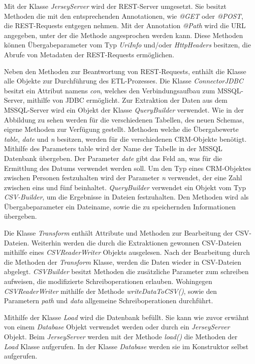 Mit der Klasse \textit{JerseyServer} wird der REST-Server umgesetzt. Sie besitzt Methoden die mit den entsprechenden Annotationen, wie \textit{@GET} oder \textit{@POST}, die REST-Requests entgegen nehmen. Mit der Annotation \textit{@Path} wird die URL angegeben, unter der die Methode angesprochen werden kann. Diese Methoden können Übergabeparameter vom Typ \textit{UriInfo} und/oder \textit{HttpHeaders} besitzen, die Abrufe von Metadaten der REST-Requests ermöglichen. 

Neben den Methoden zur Beantwortung von REST-Requests, enthält die Klasse alle Objekte zur Durchführung des ETL-Prozesses. Die Klasse \textit{ConnectorJDBC} besitzt ein Attribut namens \textit{con}, welches den Verbindungsaufbau zum MSSQL-Server, mithilfe von JDBC ermöglicht. Zur Extraktion der Daten aus dem MSSQL-Server wird ein Objekt der Klasse \textit{QueryBuilder} verwendet. Wie in der Abbildung zu sehen werden für die verschiedenen Tabellen, des neuen Schemas, eigene Methoden zur Verfügung gestellt. Methoden welche die Übergabewerte \textit{table}, \textit{date} und \textit{n} besitzen, werden für die verschiedenen CRM-Objekte benötigt. Mithilfe des Parameters table wird der Name der Tabelle in der MSSQL Datenbank übergeben. Der Parameter \textit{date} gibt das Feld an, was für die Ermittlung des Datums verwendet werden soll. Um den Typ eines CRM-Objektes zwischen Personen festzuhalten wird der Parameter \textit{n} verwendet, der eine Zahl zwischen eins und fünf beinhaltet. \textit{QueryBuilder} verwendet ein Objekt vom Typ \textit{CSV-Builder}, um die Ergebnisse in Dateien festzuhalten. Den Methoden wird als Übergabeparameter ein Dateiname, sowie die zu speichernden Informationen übergeben.

Die Klasse \textit{Transform} enthält Attribute und Methoden zur Bearbeitung der CSV-Dateien. Weiterhin werden die durch die Extraktionen gewonnen CSV-Dateien mithilfe eines \textit{CSVReaderWriter} Objekts ausgelesen. Nach der Bearbeitung durch die Methoden der \textit{Transform} Klasse, werden die Daten wieder in CSV-Dateien abgelegt. \textit{CSVBuilder} besitzt Methoden die zusätzliche Parameter zum schreiben aufweisen, die modifizierte Schreiboperationen erlauben. Wohingegen \textit{CSVReaderWriter} mithilfe der Methode \textit{writeDataToCSV()}, sowie den Parametern \textit{path} und \textit{data} allgemeine Schreiboperationen durchführt.

Mithilfe der Klasse \textit{Load} wird die Datenbank befüllt. Sie kann wie zuvor erwähnt von einem \textit{Database} Objekt verwendet werden oder durch ein \textit{JerseyServer} Objekt. Beim \textit{JerseyServer} werden mit der Methode \textit{load()} die Methoden der \textit{Load} Klasse aufgerufen. In der Klasse \textit{Database} werden sie im Konstruktor selbst aufgerufen. 

